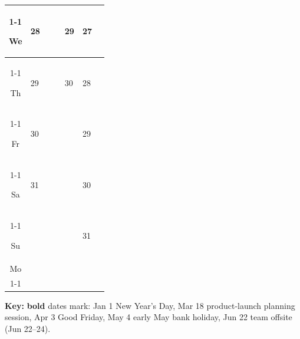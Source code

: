 \documentclass[a4paper]{article}
\newcommand{\datestrut}{\rule{0pt}{12pt}}
\begin{document}
\begin{center}
\begin{tabular}{|c||p{2.5cm}|p{2.5cm}|p{2.5cm}|p{2.5cm}|p{2.5cm}|p{2.5cm}|}
\cline{1-1}\cline{2-2}\cline{4-4}\cline{5-5}\cline{6-6}\cline{7-7}
\datestrut We & 28 &  &  & 29 & 27 &  \\
\cline{1-1}\cline{2-2}\cline{5-5}\cline{6-6}
\datestrut Th & 29 &  &  & 30 & 28 &  \\
\cline{1-1}\cline{2-2}\cline{5-5}\cline{6-6}
\datestrut Fr & 30 &  &  &  & 29 &  \\
\cline{1-1}\cline{2-2}\cline{6-6}
\datestrut Sa & 31 &  &  &  & 30 &  \\
\cline{1-1}\cline{2-2}\cline{6-6}
\datestrut Su &  &  &  &  & 31 &  \\
\hline\hline
\datestrut Mo &  &  &  &  &  &  \\
\cline{1-1}
\hline
\end{tabular}
\end{center}

\vspace{1em}
\noindent\textbf{Key:} \textbf{bold} dates mark: Jan 1 New Year's Day,
Mar 18 product-launch planning session, Apr 3 Good Friday, May 4 early May
bank holiday, Jun 22 team offsite (Jun 22--24).

\clearpage
\end{document}
